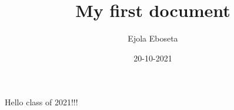 \documentclass{article}
\title{My first document}
\date{20-10-2021}
\author{Ejola Eboseta}
\begin{document}
 	\maketitle
 	\newpage
 	Hello class of 2021!!!
 
\end{document}
